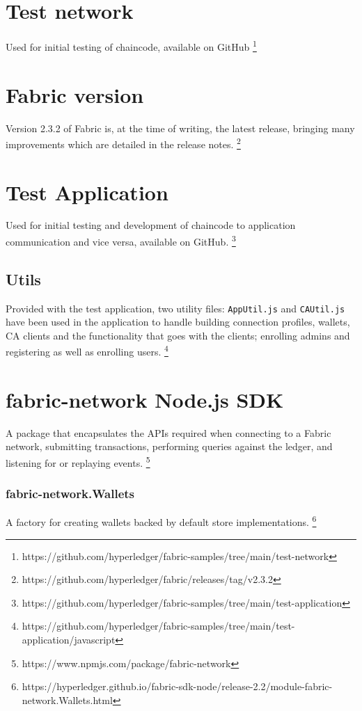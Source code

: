 \section{Test network} Used for initial testing of chaincode, available on GitHub \footnote{https://github.com/hyperledger/fabric-samples/tree/main/test-network} \label{appendix:testnet}

\section{Fabric version}
Version 2.3.2 of Fabric is, at the time of writing, the latest release, bringing many improvements which are detailed in the release notes. \footnote{https://github.com/hyperledger/fabric/releases/tag/v2.3.2} \label{appendix:version}

\section{Test Application} 
Used for initial testing and development of chaincode to application communication and vice versa, available on GitHub. \footnote{https://github.com/hyperledger/fabric-samples/tree/main/test-application} \label{appendix:testapp}
\subsection{Utils}
Provided with the test application, two utility files: \lstinline{AppUtil.js} and \lstinline{CAUtil.js} have been used in the application to handle building connection profiles, wallets, CA clients and the functionality that goes with the clients; enrolling admins and registering as well as enrolling users. \footnote{https://github.com/hyperledger/fabric-samples/tree/main/test-application/javascript} \label{appendix:utils}

\section{fabric-network Node.js SDK}
A package that encapsulates the APIs required when connecting to a Fabric network, submitting transactions, performing queries against the ledger, and listening for or replaying events. \footnote{https://www.npmjs.com/package/fabric-network} \label{appendix:nodesdk}

\subsubsection{fabric-network.Wallets}
A factory for creating wallets backed by default store implementations. \footnote{https://hyperledger.github.io/fabric-sdk-node/release-2.2/module-fabric-network.Wallets.html} \label{appendix:fabnetwallets}

